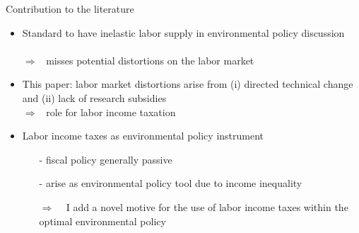 \documentclass[11pt,aspectratio=169]{beamer}
\newcommand{\ar}{$\Rightarrow$ \ }
\begin{document}
\begin{frame}{Contribution to the literature}
\begin{itemize}[<+->]
	\item \alert{Standard to have inelastic labor supply in environmental policy discussion}\\  \footnotesize{ \citep{Acemoglu2012TheChange, Golosov2014OptimalEquilibrium, Acemoglu2016TransitionTechnology, Fried2018ClimateAnalysis, Hart2019TheEconomists}}
	\\  \normalsize{\alert{\ar misses potential distortions on the labor market}}
	\vspace{2mm}
	\item \alert{This paper}: labor market distortions arise from (i) directed technical change and (ii) lack of research subsidies \footnotesize{\citep{Acemoglu2012TheChange}}
	\\ \normalsize{\alert{\ar role for labor income taxation}}
	\vspace{2mm}
	\item \alert{Labor income taxes as environmental policy instrument}
	\begin{itemize}
		\item[-]  fiscal policy generally passive \footnotesize{ \citep{ LansBovenberg1994EnvironmentalTaxation, Goulder1995EnvironmentalGuide, Barrage2019OptimalPolicy}}
		\item[-] arise as environmental policy tool due to income inequality \footnotesize{\citep{Jacobs2019RedistributionCurves, Dobkowitz2022, Douenne2022OptimalHouseholds}}
		\item[\ar] I add a novel motive for the use of labor income taxes within the optimal environmental policy
	\end{itemize}

\end{itemize}
\end{frame}
\end{document}

